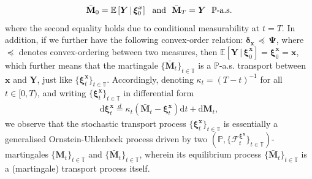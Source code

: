 \documentclass{article}
\def\P{\mathbb{P}}
\def\E{\mathbb{E}}
\def\T{\mathbb{T}}
\def\dd{\mathrm{d}}
\def\F{\mathcal{F}}
\def\xib{\boldsymbol{\xi}}
\theoremstyle{definition}
\begin{document}
\begin{align}
\bar{\mathbf{M}}_0 = \E\left[ \boldsymbol{Y} \, | \, \xib^{\boldsymbol{x}}_0 \right] \,\,\,\, \text{and} \,\,\,\, \bar{\mathbf{M}}_T = \boldsymbol{Y} \,\,\,\, \text{$\P$-a.s.} \notag
\end{align}
where the second equality holds due to conditional measurability at $t=T$. In addition, if we further have the following convex-order relation: $\boldsymbol{\delta}_{\boldsymbol{x}} \, \preceq \,  \boldsymbol{\Psi}$, where $\preceq$ denotes convex-ordering between two measures, then $\E\left[ \boldsymbol{Y} \, | \, \xib^{\boldsymbol{x}}_0 \right] = \xib^{\boldsymbol{x}}_0 = \boldsymbol{x}$, which further means that the martingale $\{\bar{\mathbf{M}}_t\}_{t\in\T}$ is a $\P$-a.s. transport between $\boldsymbol{x}$ and $\boldsymbol{Y}$, just like $\{\xib^{\boldsymbol{x}}_t\}_{t\in\T}$. Accordingly, denoting $\kappa_t = (T-t)^{-1}$ for all $t\in[0,T)$, and writing $\{\xib^{\boldsymbol{x}}_t\}_{t\in\T}$ in differential form
\begin{align}
\label{ornsteinuhlenbeck}
\dd\xib^{\boldsymbol{x}}_t \overset{d}{=} \kappa_t(\bar{\mathbf{M}}_t  - \xib^{\boldsymbol{x}}_t )\dd t + \dd \mathbf{M}_t,
\end{align}
we observe that the stochastic transport process $\{\xib^{\boldsymbol{x}}_t\}_{t\in\T}$ is essentially a generalised Ornstein-Uhlenbeck process driven by two $(\P,\{\F_{t}^{\xib^{\boldsymbol{x}}}\}_{t\in\T})$-martingales $\{\mathbf{M}_t\}_{t\in\T}$ and $\{\bar{\mathbf{M}}_t\}_{t\in\T}$, wherein its equilibrium process $\{\bar{\mathbf{M}}_t\}_{t\in\T}$ is a (martingale) transport process itself.
\end{document}
